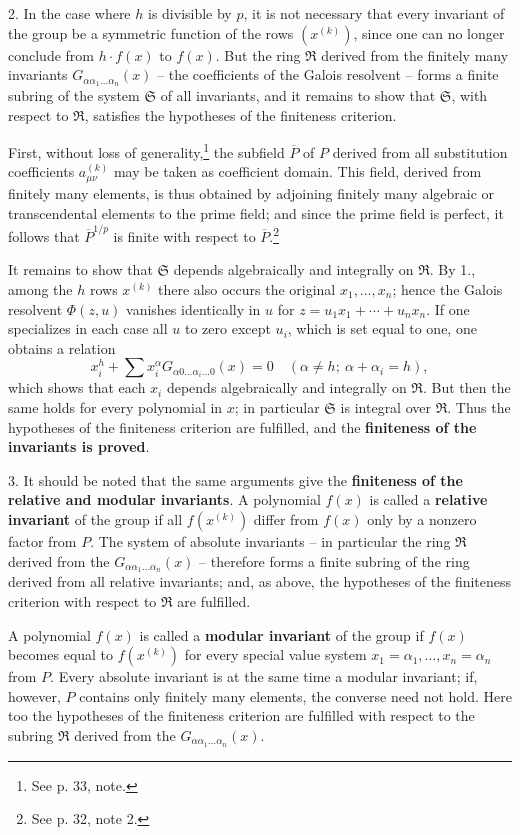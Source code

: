 \documentclass[11pt]{article}
\begin{document}
2. In the case where $h$ is divisible by $p$, it is not necessary that every invariant of the group be a symmetric function of the rows $(x^{(k)})$, since one can no longer conclude from $h\cdot f(x)$ to $f(x)$. But the ring $\mathfrak R$ derived from the finitely many invariants $G_{\alpha\alpha_1\ldots\alpha_n}(x)$ -- the coefficients of the Galois resolvent -- forms a finite subring of the system $\mathfrak S$ of all invariants, and it remains to show that $\mathfrak S$, with respect to $\mathfrak R$, satisfies the hypotheses of the finiteness criterion.

First, without loss of generality,\footnote{See p. 33, note.} the subfield $\overline P$ of $P$ derived from all substitution coefficients $a_{\mu\nu}^{(k)}$ may be taken as coefficient domain. This field, derived from finitely many elements, is thus obtained by adjoining finitely many algebraic or transcendental elements to the prime field; and since the prime field is perfect, it follows that $\overline P^{1/p}$ is finite with respect to $\overline P$.\footnote{See p. 32, note 2.}

It remains to show that $\mathfrak S$ depends algebraically and integrally on $\mathfrak R$. By 1., among the $h$ rows $x^{(k)}$ there also occurs the original $x_1,
\ldots,x_n$; hence the Galois resolvent $\Phi(z,u)$ vanishes identically in $u$ for $z=u_1x_1+\cdots+u_nx_n$. If one specializes in each case all $u$ to zero except $u_i$, which is set equal to one, one obtains a relation
\[
 x_i^h+\sum x_i^\alpha G_{\alpha0\ldots\alpha_i\ldots0}(x)=0
 \quad (\alpha\ne h;\ \alpha+\alpha_i=h),
\]
which shows that each $x_i$ depends algebraically and integrally on $\mathfrak R$. But then the same holds for every polynomial in $x$; in particular $\mathfrak S$ is integral over $\mathfrak R$. Thus the hypotheses of the finiteness criterion are fulfilled, and the \textbf{finiteness of the invariants is proved}.

3. It should be noted that the same arguments give the \textbf{finiteness of the relative and modular invariants}. A polynomial $f(x)$ is called a \textbf{relative invariant} of the group if all $f(x^{(k)})$ differ from $f(x)$ only by a nonzero factor from $P$. The system of absolute invariants -- in particular the ring $\mathfrak R$ derived from the $G_{\alpha\alpha_1\ldots\alpha_n}(x)$ -- therefore forms a finite subring of the ring derived from all relative invariants; and, as above, the hypotheses of the finiteness criterion with respect to $\mathfrak R$ are fulfilled.

A polynomial $f(x)$ is called a \textbf{modular invariant} of the group if $f(x)$ becomes equal to $f(x^{(k)})$ for every special value system $x_1=\alpha_1,
\ldots,x_n=\alpha_n$ from $P$. Every absolute invariant is at the same time a modular invariant; if, however, $P$ contains only finitely many elements, the converse need not hold. Here too the hypotheses of the finiteness criterion are fulfilled with respect to the subring $\mathfrak R$ derived from the $G_{\alpha\alpha_1\ldots\alpha_n}(x)$.
\end{document}
